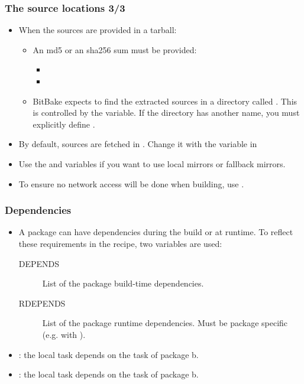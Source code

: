 \begin{frame}
  \frametitle{The source locations 3/3}
  \begin{itemize}
    \item When the sources are provided in a tarball:
      \begin{itemize}
        \item An md5 or an sha256 sum must be provided:
          \begin{itemize}
            \item {}
            \item {}
          \end{itemize}
        \item BitBake expects to find the extracted sources in a
          directory called . This is
          controlled by the  variable. If the directory has
          another name, you must explicitly define .
      \end{itemize}
    \item By default, sources are fetched in
      . Change it with the 
      variable in 
    \item Use the  and  variables if
      you want to use local mirrors or fallback mirrors.
    \item To ensure no network access will be done when building, use
      .
  \end{itemize}
\end{frame}

\begin{frame}
  \frametitle{Dependencies}
  \begin{itemize}
    \item A package can have dependencies during the build or at
          runtime. To reflect these requirements in the recipe, two
          variables are used:
    \begin{description}
      \item[DEPENDS] List of the package build-time dependencies.
      \item[RDEPENDS] List of the package runtime
        dependencies. Must be package specific (e.g. with
        ).
    \end{description}
    \item {}: the local 
      task depends on the  task of package
      b.
    \item {}: the local
       task depends on the
       task of package b.
  \end{itemize}
\end{frame}

